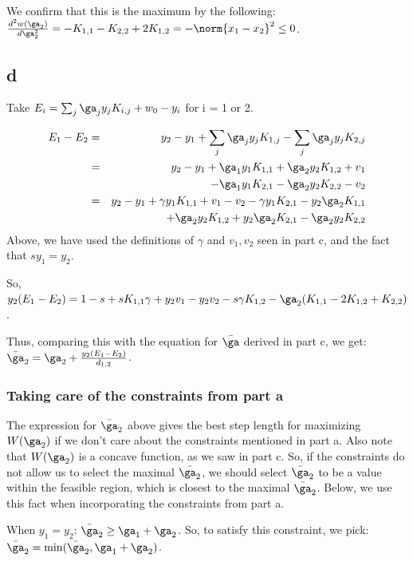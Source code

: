 \documentclass{article}
\begin{document}
We confirm that this is the maximum by the following: $\frac{d^{2}w(\ga_{2})}{d\ga_{2}^{2}} = -K_{1,1} - K_{2,2} + 2K_{1,2} = -\norm{x_{1} - x_{2}}^{2}\leq 0$.

\subsection{d}
Take $E_{i} = \sum_{j} \ga_{j}y_{j}K_{i,j} + w_{0} - y_{i}$ for i = 1 or 2.

\begin{eqnarray}
E_{1} - E_{2} &=& y_{2} - y_{1} + \sum_j \ga_{j}y_{j}K_{1,j} - \sum_j \ga_{j}y_{j}K_{2,j} \\
&=& y_{2} - y_{1} + \ga_{1}y_{1}K_{1,1} + \ga_{2}y_{2}K_{1,2} + v_{1} \\
&& - \ga_{1}y_{1}K_{2,1} - \ga_{2}y_{2}K_{2,2} - v_{2}\\
&=& y_{2} - y_{1} + \gamma y_{1}K_{1,1} + v_{1} - v_{2} - \gamma y_{1}K_{2,1} - y_{2}\ga_{2}K_{1,1} \\
&& + \ga_{2}y_{2}K_{1,2} + y_{2}\ga_{2}K_{2,1} - \ga_{2}y_{2}K_{2,2}\\
\end{eqnarray}
Above, we have used the definitions of $\gamma$ and $v_{1}, v_{2}$ seen in part c, and the fact that $sy_{1} = y_{2}$.

So, $y_{2}(E_{1} - E_{2}) = 1-s + sK_{1,1}\gamma + y_{2}v_{1} - y_{2}v_{2} - s\gamma K_{1,2} - \ga_{2}(K_{1,1} - 2K_{1,2}+ K_{2,2})$.

Thus, comparing this with the equation for $\bar{\ga}$ derived in part c, we get: $\bar{\ga}_{2} = \ga_{2} + \frac{y_{2}(E_{1} - E_{2})}{d_{1,2}}$.

\subsubsection{Taking care of the constraints from part a}
The expression for $\bar{\ga}_{2}$ above gives the best step length for maximizing $W(\ga_{2})$ if we don't care about the constraints mentioned in part a. Also note that $W(\ga_{2})$ is a concave function, as we saw in part c. So, if the constraints do not allow us to select the maximal $\bar{\ga_{2}}$, we should select $\bar{\ga}_2$ to be a value within the feasible region, which is closest to the maximal $\bar{\ga}_2$. Below, we use this fact when incorporating the constraints from part a.

When $y_{1} = y_{2}$: $\bar{\ga}_{2} \geq \ga_{1} + \ga_{2}$. So, to satisfy this constraint, we pick: $\bar{\ga}_{2} = \min(\bar{\ga}_2, \ga_{1} + \ga_{2})$.
\end{document}
